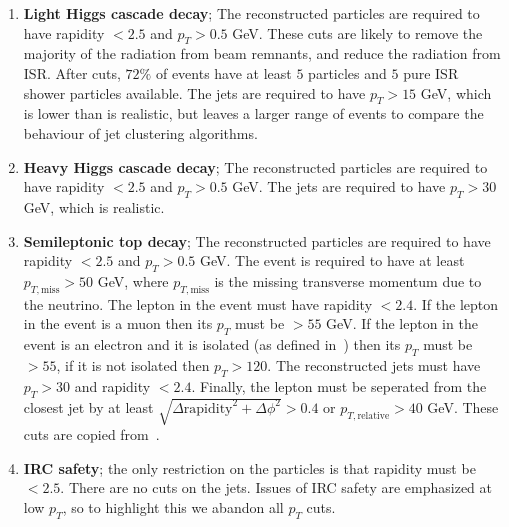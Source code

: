     \begin{enumerate}
        \item \textbf{Light Higgs cascade decay}; The reconstructed particles are required to have
            rapidity \(< 2.5\) and \(p_T > 0.5\) GeV.
            These cuts are likely to remove the majority of the radiation from beam remnants,
            and reduce the radiation from ISR.
            After cuts, \(72\%\) of events have at least \(5\)  particles and \(5\) pure ISR shower particles available.
            The jets are required to have \(p_T > 15\) GeV, which is lower than is realistic,
            but leaves a larger range of events to compare the behaviour of jet clustering algorithms.
        \item \textbf{Heavy Higgs cascade decay}; The reconstructed particles are required to have
            rapidity \(< 2.5\) and \(p_T > 0.5\) GeV.
            The jets are required to have \(p_T > 30\) GeV, which is realistic.
            
        \item \textbf{Semileptonic top decay}; The reconstructed particles are required to have
            rapidity \(< 2.5\) and \(p_T > 0.5\) GeV.
            The event is required to have at least \(p_{T,\text{miss}} > 50\) GeV,
            where \(p_{T, \text{miss}}\) is the missing transverse momentum due to 
            the neutrino.
            The lepton in the event must have rapidity \(< 2.4\).
            If the lepton in the event is a muon then its \(p_T\) must be \(>  55\) GeV.
            If the lepton in the event is an electron and it is isolated (as defined in~\cite{Sirunyan_2018}) then its \(p_T\) must be \(> 55\), if it is not isolated then \(p_T > 120\).
            The reconstructed jets must have \(p_T > 30\) and rapidity \(< 2.4\).
            Finally, the lepton must be seperated from the closest jet by at least
            \(\sqrt{\Delta \text{rapidity}^2 + \Delta \phi^2} > 0.4\) or
            \(p_{T, \text{relative}} > 40\) GeV.
            These cuts are copied from~\cite{Sirunyan_2020}.
        \item \textbf{IRC safety}; the only restriction on the particles is that rapidity must be \(< 2.5\).
            There are no cuts on the jets.
            Issues of IRC safety are emphasized at low \(p_T\), so to highlight this we abandon all \(p_T\) cuts.

    \end{enumerate}

